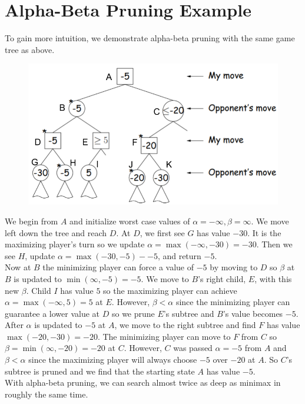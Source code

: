 \documentclass[12pt, letterpaper]{article}
\begin{document}
\section*{Alpha-Beta Pruning Example}
To gain more intuition, we demonstrate alpha-beta pruning with the same game tree as above.
\begin{figure}[H]
\centering
\includegraphics[scale=0.4]{alpha-beta.png}
\end{figure}
We begin from $A$ and initialize worst case values of $\alpha = -\infty, \beta = \infty$. We move left down the tree and reach $D$. At $D$, we first see $G$ has value $-30$. It is the maximizing player's turn so we update $\alpha = \max(-\infty, -30) = -30$. Then we see $H$, update $\alpha = \max(-30, -5) - -5$, and return $-5$. \\[0.2cm]
Now at $B$ the minimizing player can force a value of $-5$ by moving to $D$ so $\beta$ at $B$ is updated to $\min(\infty, -5) = -5$. We move to $B$'s right child, $E$, with this new $\beta$. Child $I$ has value $5$ so the maximizing player can achieve $\alpha = \max(-\infty, 5) = 5$ at $E$. However, $\beta < \alpha$ since the minimizing player can guarantee a lower value at $D$ so we prune $E$'s subtree and $B$'s value becomes $-5$. \\[0.2cm]
After $\alpha$ is updated to $-5$ at $A$, we move to the right subtree and find $F$ has value $\max(-20, -30) = -20$. The minimizing player can move to $F$ from $C$ so $\beta = \min(\infty, -20) = -20$ at $C$. However, $C$ was passed $\alpha = -5$ from $A$ and $\beta < \alpha$ since the maximizing player will always choose $-5$ over $-20$ at $A$. So $C$'s subtree is pruned and we find that the starting state $A$ has value $-5$. \\[0.2cm]
With alpha-beta pruning, we can search almost twice as deep as minimax in roughly the same time. \\[0.2cm]
\end{document}
